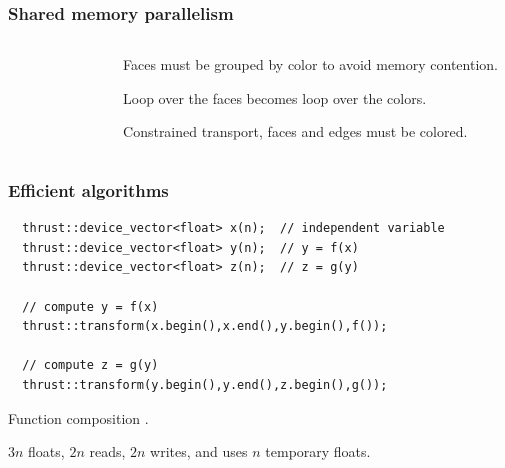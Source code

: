 \documentclass{beamer}
\begin{document}
\begin{frame}[fragile]
\frametitle{Shared memory parallelism}
\begin{columns}
\begin{column}{0.5\textwidth}
\begin{figure}[htbp]
\end{figure}
\end{column}
\begin{column}{0.5\textwidth}
\bei
\item Faces must be grouped by color to avoid memory contention.
\item Loop over the faces becomes loop over the colors.
\pause
\item Constrained transport, faces and edges must be colored.
\ebi
\end{column}
\end{columns}
\end{frame}

\begin{frame}[fragile]
\frametitle{Efficient algorithms}

\begin{lstlisting}
  thrust::device_vector<float> x(n);  // independent variable
  thrust::device_vector<float> y(n);  // y = f(x)
  thrust::device_vector<float> z(n);  // z = g(y)

  // compute y = f(x)
  thrust::transform(x.begin(),x.end(),y.begin(),f());

  // compute z = g(y) 
  thrust::transform(y.begin(),y.end(),z.begin(),g());
\end{lstlisting} 
\bei
\item Function composition \citep{Thrust}.
\item $3n$ floats, $2n$ reads, $2n$ writes, and uses $n$ temporary floats.
\ebi
\end{frame}
\end{document}

